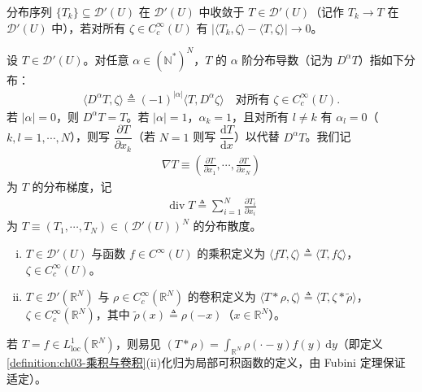 \documentclass[../../main.tex]{subfiles}%
\begin{document}
\begin{definition}\label{definition:ch03-分布收敛}
分布序列 $\{T_k\}\subseteq\mathcal{D}'(U)$ 在 $\mathcal{D}'(U)$ 中收敛于 $T\in\mathcal{D}'(U)$（记作 $T_k\to T$ 在 $\mathcal{D}'(U)$ 中），若对所有 $\zeta\in C^\infty_c(U)$ 有 $|\langle T_k,\zeta\rangle-\langle T,\zeta\rangle|\to0$。
\end{definition}

\begin{definition}\label{definition:ch03-分布导数定义}
设 $T\in\mathcal{D}'(U)$。对任意 $\alpha\in(\mathbb{N}^*)^N$，$T$ 的 $\alpha$ 阶分布导数（记为 $D^\alpha T$）指如下分布：
\begin{align*}
\langle D^\alpha T,\zeta\rangle \triangleq  (-1)^{|\alpha|}\langle T,D^\alpha\zeta\rangle
\quad \text{对所有 }\zeta\in C^\infty_c(U).
\end{align*}
若 $|\alpha|=0$，则 $D^\alpha T=T$。若 $|\alpha|=1$，$\alpha_k=1$，且对所有 $l\neq k$ 有 $\alpha_l=0$（$k,l=1,\cdots ,N$），则写 $\dfrac{\partial T}{\partial x_k}$（若 $N=1$ 则写 $\dfrac{\mathrm{d}T}{\mathrm{d}x}$）以代替 $D^\alpha T$。我们记
\begin{align*}
\nabla T\equiv\left(\frac{\partial T}{\partial x_1},\cdots ,\frac{\partial T}{\partial x_N}\right)
\end{align*}
为 $T$ 的分布梯度，记
\begin{align*}
\operatorname{div}T \triangleq  \sum_{i=1}^N\frac{\partial T_i}{\partial x_i}
\end{align*}
为 $T\equiv(T_1,\cdots ,T_N)\in(\mathcal{D}'(U))^N$ 的分布散度。
\end{definition}

\begin{definition}\label{definition:ch03-乘积与卷积}
\label{definition:ch03-磨光}
\begin{enumerate}[(i)]
\item $T\in\mathcal{D}'(U)$ 与函数 $f\in C^\infty(U)$ 的乘积定义为 $\langle fT,\zeta\rangle\triangleq \langle T,f\zeta\rangle$，$\zeta\in C^\infty_c(U)$。
\item $T\in\mathcal{D}'(\mathbb{R}^N)$ 与 $\rho\in C^\infty_c(\mathbb{R}^N)$ 的卷积定义为 $\langle T*\rho,\zeta\rangle\triangleq \langle T,\zeta*\widetilde\rho\rangle$，$\zeta\in C^\infty_c(\mathbb{R}^N)$，其中 $\widetilde\rho(x)\triangleq \rho(-x)$（$x\in\mathbb{R}^N$）。
\end{enumerate}
\end{definition}

若 $T=f\in L^1_{\mathrm{loc}}(\mathbb{R}^N)$，则易见 $(T*\rho)=\int_{\mathbb{R}^N}\rho(\cdot-y)f(y)\,\mathrm{d}y$（即定义\ref{definition:ch03-乘积与卷积}(ii)化归为局部可积函数的定义，由 Fubini 定理保证适定）。
\end{document}
